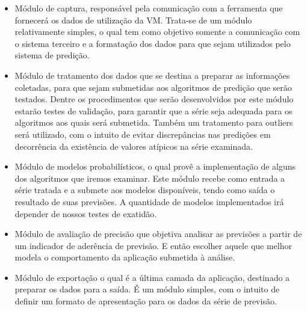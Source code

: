 \documentclass[twoside,english,brazilian]{UNISINOSmonografia}
\begin{document}
\begin{itemize}
	\item Módulo de captura, responsável pela comunicação com a ferramenta que fornecerá os dados de utilização da VM. Trata-se de um módulo relativamente simples, o qual tem como objetivo somente a comunicação com o sistema terceiro e a formatação dos dados para que sejam utilizados pelo sistema de predição.
	\item Módulo de tratamento dos dados que se destina a preparar as informações coletadas, para que sejam submetidas aos algoritmos de predição que serão testados. Dentre os procedimentos que serão desenvolvidos por este módulo estarão testes de validação, para garantir que a série seja adequada para os algoritmos aos quais será submetida. Também um tratamento para outliers será utilizado, com o intuito de evitar discrepâncias nas predições em decorrência da existência de valores atípicos na série examinada.
	\item Módulo de modelos probabilísticos, o qual provê a implementação de alguns dos algoritmos que iremos examinar. Este módulo recebe como entrada a série tratada e a submete aos modelos disponíveis, tendo como saída o resultado de suas previsões. A quantidade de modelos implementados irá depender de nossos testes de exatidão.
	\item Módulo de avaliação de precisão que objetiva analisar as previsões a partir de um indicador de aderência de previsão. E então escolher aquele que melhor modela o comportamento da aplicação submetida à análise.
	\item Módulo de exportação o qual é a última camada da aplicação, destinado a preparar os dados para a saída. É um módulo simples, com o intuito de definir um formato de apresentação para os dados da série de previsão.
\end{itemize}
\end{document}
